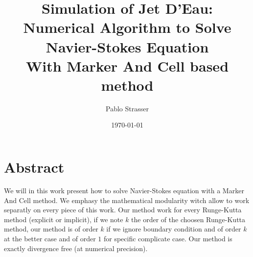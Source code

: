 \documentclass[a4paper]{master}
\title{Simulation of Jet D'Eau:\\ Numerical Algorithm to Solve Navier-Stokes Equation\\
With Marker And Cell based method}
\author{Pablo Strasser}
\date{\today}
\begin{document}
\captionsetup{singlelinecheck=off,margin=10pt,font=small,labelfont=bf}
\maketitle
\dominitoc

\chapter*{Abstract}

\mtcaddchapter[Abstract]

We will in this work present how to solve Navier-Stokes equation with a Marker And Cell method.
We emphasy the mathematical modularity witch allow to work separatly on every piece of this work.
Our method work for every Runge-Kutta method (explicit or implicit), if we note $k$ the order of the choosen Runge-Kutta method,
our method is of order $k$ if we ignore boundary condition and of order $k$ at the better case and of order $1$ for specific complicate case.
Our method is exactly divergence free (at numerical precision).
\tableofcontents





\end{document}
